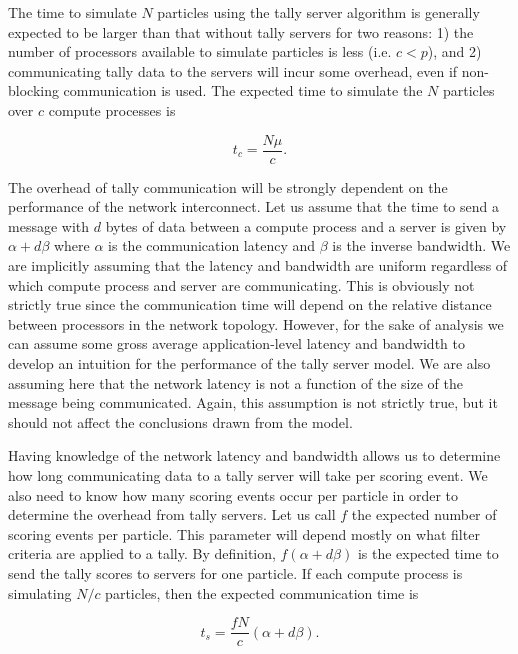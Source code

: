 \documentclass[3p]{elsarticle}
\begin{document}
The time to simulate $N$ particles using the tally server algorithm is generally
expected to be larger than that without tally servers for two reasons: 1) the
number of processors available to simulate particles is less (i.e. $c < p$), and
2) communicating tally data to the servers will incur some overhead, even if
non-blocking communication is used. The expected time to simulate the $N$
particles over $c$ compute processes is

\begin{equation}
  \label{eq:compute-time}
  t_c = \frac{N\mu}{c}.
\end{equation}

\noindent The overhead of tally communication will be strongly dependent on the
performance of the network interconnect. Let us assume that the time to send a
message with $d$ bytes of data between a compute process and a server is given
by $\alpha + d\beta$ where $\alpha$ is the communication latency and $\beta$ is
the inverse bandwidth. We are implicitly assuming that the latency and bandwidth
are uniform regardless of which compute process and server are
communicating. This is obviously not strictly true since the communication time
will depend on the relative distance between processors in the network
topology. However, for the sake of analysis we can assume some gross average
application-level latency and bandwidth to develop an intuition for the
performance of the tally server model. We are also assuming here that the
network latency is not a function of the size of the message being
communicated. Again, this assumption is not strictly true, but it should not
affect the conclusions drawn from the model.

Having knowledge of the network latency and bandwidth allows us to determine how
long communicating data to a tally server will take per scoring event.  We also
need to know how many scoring events occur per particle in order to determine
the overhead from tally servers. Let us call $f$ the expected number of scoring
events per particle. This parameter will depend mostly on what filter criteria
are applied to a tally. By definition, $f(\alpha + d\beta)$ is the expected time
to send the tally scores to servers for one particle. If each compute process is
simulating $N/c$ particles, then the expected communication time is

\begin{equation}
  \label{eq:send-time}
  t_s = \frac{fN}{c} \left ( \alpha + d\beta \right ).
\end{equation}
\end{document}
